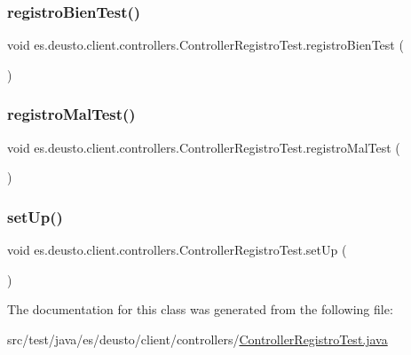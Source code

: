 \subsubsection{\texorpdfstring{registroBienTest()}{registroBienTest()}}
{\footnotesize\ttfamily void es.\+deusto.\+client.\+controllers.\+Controller\+Registro\+Test.\+registro\+Bien\+Test (\begin{DoxyParamCaption}{ }\end{DoxyParamCaption})}

\mbox{\label{classes_1_1deusto_1_1client_1_1controllers_1_1_controller_registro_test_ae8171ee6eae5df44924c7e4fdba6fc82}} 
\subsubsection{\texorpdfstring{registroMalTest()}{registroMalTest()}}
{\footnotesize\ttfamily void es.\+deusto.\+client.\+controllers.\+Controller\+Registro\+Test.\+registro\+Mal\+Test (\begin{DoxyParamCaption}{ }\end{DoxyParamCaption})}

\mbox{\label{classes_1_1deusto_1_1client_1_1controllers_1_1_controller_registro_test_ac5cd8c8fa69d92f474168a782f5fcbaf}} 
\subsubsection{\texorpdfstring{setUp()}{setUp()}}
{\footnotesize\ttfamily void es.\+deusto.\+client.\+controllers.\+Controller\+Registro\+Test.\+set\+Up (\begin{DoxyParamCaption}{ }\end{DoxyParamCaption})}



The documentation for this class was generated from the following file\+:\begin{DoxyCompactItemize}
\item 
src/test/java/es/deusto/client/controllers/\mbox{\hyperlink{_controller_registro_test_8java}{Controller\+Registro\+Test.\+java}}\end{DoxyCompactItemize}
